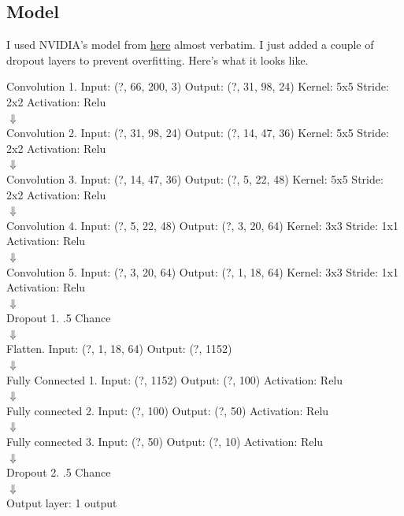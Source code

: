 \documentclass[letterpaper,12pt]{article}
\begin{document}
	\subsection*{Model}
	I used NVIDIA's model from \href{http://images.nvidia.com/content/tegra/automotive/images/2016/solutions/pdf/end-to-end-dl-using-px.pdf}{here} almost verbatim. I just added a couple of dropout layers to prevent overfitting. Here's what it looks like.
	\begin{center}

		Convolution 1. Input: (?, 66, 200, 3) Output: (?, 31, 98, 24) Kernel: 5x5 Stride: 2x2 Activation: Relu\\
		$\Downarrow$\\
		Convolution 2. Input: (?, 31, 98, 24) Output: (?, 14, 47, 36) Kernel: 5x5 Stride: 2x2 Activation: Relu\\
		$\Downarrow$\\
		Convolution 3. Input: (?, 14, 47, 36) Output: (?, 5, 22, 48) Kernel: 5x5 Stride: 2x2 Activation: Relu\\
		$\Downarrow$\\
		Convolution 4. Input: (?, 5, 22, 48) Output: (?, 3, 20, 64) Kernel: 3x3 Stride: 1x1 Activation: Relu\\
		$\Downarrow$\\
		Convolution 5. Input: (?, 3, 20, 64) Output: (?, 1, 18, 64) Kernel: 3x3 Stride: 1x1 Activation: Relu\\
		$\Downarrow$\\
		Dropout 1. .5 Chance\\
		$\Downarrow$\\
		Flatten. Input: (?, 1, 18, 64) Output: (?, 1152)\\
		$\Downarrow$\\
		Fully Connected 1. Input: (?, 1152) Output: (?, 100) Activation: Relu\\
		$\Downarrow$\\
		Fully connected 2. Input: (?, 100) Output: (?, 50) Activation: Relu\\
		$\Downarrow$\\
		Fully connected 3. Input: (?, 50) Output: (?, 10) Activation: Relu\\
		$\Downarrow$\\
		Dropout 2. .5 Chance\\
		$\Downarrow$\\
		Output layer: 1 output

	\end{center}
\end{document}
